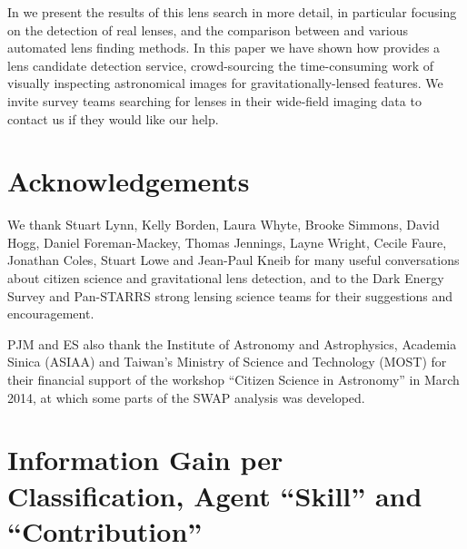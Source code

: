 \documentclass[useAMS,usenatbib,a4paper]{mn2e}
\begin{document}
In \PaperTwo we present the results of this \cfhtls lens search in more detail,
in particular focusing on the detection of real lenses, and the comparison
between \SW and various automated lens finding methods. In this paper  we have
shown how \SW provides a lens candidate detection service, crowd-sourcing the
time-consuming work of visually inspecting astronomical images for
gravitationally-lensed features. We invite survey teams searching for lenses in
their wide-field imaging data to contact us if they would like our help.



\section*{Acknowledgements}

We thank Stuart Lynn, Kelly Borden, Laura Whyte, Brooke Simmons,
David Hogg, Daniel Foreman-Mackey,
Thomas Jennings, Layne  Wright, Cecile Faure, Jonathan Coles, Stuart
Lowe and Jean-Paul Kneib for many useful conversations about citizen science and
gravitational lens detection, and to the Dark Energy Survey and Pan-STARRS strong
lensing science teams for their suggestions and encouragement.

PJM and ES also thank the Institute of Astronomy and Astrophysics, Academia Sinica
(ASIAA) and Taiwan's Ministry of Science and Technology (MOST) for their
financial support of the workshop ``Citizen Science in Astronomy'' in March
2014, at which some parts of the SWAP analysis was developed.









\appendix


\section{Information Gain per Classification, Agent ``Skill'' and ``Contribution''}
\label{appendix:swap}
\end{document}
